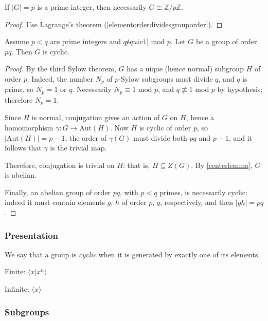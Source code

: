 \begin{proposition}
If $|G| = p$ is a prime integer, then necessarily $G \cong \mathbb{Z} / p \mathbb{Z}$.
\end{proposition}

\begin{proof}
Use Lagrange's theorem (\ref{elementorderdividesgrouporder}).
\end{proof}

\begin{proposition}
Assume $p<q$ are prime integers and $q \not equiv 1 ] \textrm{ mod } p$. Let $G$ be a group of order $pq$. Then $G$ is cyclic.
\end{proposition}

\begin{proof}
By the third Sylow theorem, $G$ has a uique (hence normal) subgroup $H$ of order $p$. Indeed, the number $N_p$ of $p$-Sylow subgroups must
divide $q$, and $q$ is prime, so $N_p = 1$ or $q$. Necessarily $N_p \equiv 1 \textrm{ mod } p$, and $q \not \equiv 1$ mod $p$ by hypothesis;
therefore $N_p = 1$.

Since $H$ is normal, conjugation gives an action of $G$ on $H$, hence a homomorphism $\gamma : G \rightarrow \textrm{Aut}(H)$. Now $H$ is cyclic
of order $p$, so $|\textrm{Aut}(H)| = p - 1$; the order of $\gamma(G)$ must divide both $pq$ and $p - 1$, and it follows that $\gamma$ is the
trivial map.

Therefore, conjugation is trivial on $H$: that is, $H \subseteq Z(G)$. By \ref{centerlemma}, $G$ is abelian.

Finally, an abelian group of order $pq$, with $p < q$ primes, is necessarily cyclic: indeed it must contain elements $g$, $h$ of order $p$, $q$, respectively,
and then $|gh| = pq$.
\end{proof}

\subsubsection{Presentation}
We say that a group is \emph{cyclic} when it is generated by exactly one of its elements.

\noindent Finite: $\langle x | x^n \rangle$\newline

\noindent Infinite: $\langle x \rangle$

\subsubsection{Subgroups}

